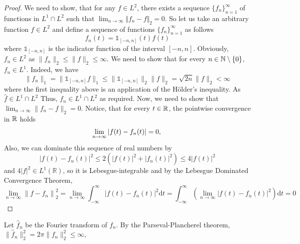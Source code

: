 \begin{proof}
    We need to show, that for any \(f \in L^2\), there exists a sequence \(\{f_n\}_{n=1}^{\infty}\) of functions
    in \(L^1 \cap L^2\) such that \(\lim_{n \to \infty} \Vert f_n - f \Vert_2 = 0\). So let us take an arbitrary
    function \(f \in L^2\) and define a sequence of functions \(\{f_n\}_{n=1}^{\infty}\) as follows
    \begin{equation*}
        f_n(t) = \mathbb{1}_{[-n,n]}(t)f(t)
    \end{equation*}
    where \(\mathbb{1}_{[-n,n]}\) is the indicator function of the interval \([-n,n]\). Obviously, \(f_n \in L^2\)
    as \(\lVert f_n \rVert_2 \leq \lVert f \rVert_2 \leq \infty \).  We need to show that for every
    \(n \in \mathbb{N}\setminus \left\{ 0 \right\}  \), \(f_n \in L^1\). Indeed, we have
    \begin{equation*}
        \lVert f_n \rVert_1 = \lVert \mathbb{1}_{[-n,n]}f \rVert_1 \leq \lVert \mathbb{1}_{[-n,n]} \rVert_2 \lVert f \rVert_2
        = \sqrt{2n} \lVert f \rVert_2 < \infty
    \end{equation*}
    where the first inequality above is an application of the Hölder's inequality. As \(\hat{f} \in L^1\cap L^2\)
    Thus, \(f_n \in L^1 \cap L^2\) as required. Now, we need to show that \(\lim_{n \to \infty} \lVert f_n - f \rVert_2 = 0\).
    Notice, that for every \(t\in\mathbb{R}\), the pointwise convergence in \(\mathbb{R}\)  holds
    \begin{equation*}
        \lim_{n \to  \infty} \vert  f(t)-f_n(t) \vert=0,                                           \\
    \end{equation*}
    Also, we can dominate this sequence of real numbers by
    \begin{equation*}
        \left|f(t)-f_n(t)\right|^2 \leq 2\left(|f(t)|^2+\left|f_n(t)\right|^2\right) \leq 4|f(t)|^2
    \end{equation*}
    and \(4|f|^2 \in L^1(\mathbb{R})\), so it is Lebesgue-integrable and by the Lebesgue Dominated Convergence Theorem,
    \begin{equation*}
        \lim_{n \to \infty}\left\|f-f_n\right\|_2^2=\lim_{n \to  \infty} \int_{-\infty}^{\infty}\left|f(t)-f_n(t)\right|^2 \mathrm{d}t =\int_{-\infty}^{\infty}\left(\lim_{n \to  \infty}\left|f(t)-f_n(t)\right|^2\right) \mathrm{d}t =0
    \end{equation*}
\end{proof}
Let \(\hat{f}_n\) be the Fourier transform of \(f_n\). By the Parseval-Plancherel theorem, \(\lVert \hat{f}_n \rVert_2^2 = 2\pi \lVert f_n \rVert_2^2 \leq \infty  \),
